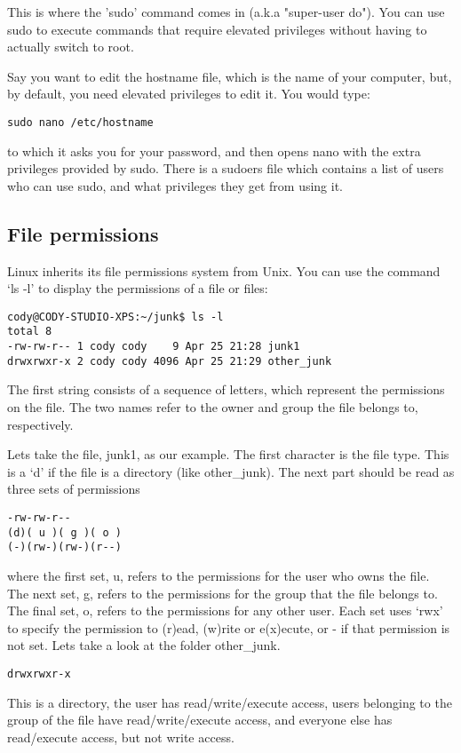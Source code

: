 \documentclass{article}
\begin{document}
This is where the 'sudo' command comes in (a.k.a "super-user do"). You can use sudo to execute commands that require elevated privileges without having to actually switch to root.

Say you want to edit the hostname file, which is the name of your computer, but, by default, you need elevated privileges to edit it. You would type:
\begin{verbatim}
sudo nano /etc/hostname
\end{verbatim}
to which it asks you for your password, and then opens nano with the extra privileges provided by sudo. There is a sudoers file which contains a list of users who can use sudo, and what privileges they get from using it.

\subsection{File permissions}
Linux inherits its file permissions system from Unix. You can use the command `ls -l' to display the permissions of a file or files:
\begin{verbatim}
cody@CODY-STUDIO-XPS:~/junk$ ls -l
total 8
-rw-rw-r-- 1 cody cody    9 Apr 25 21:28 junk1
drwxrwxr-x 2 cody cody 4096 Apr 25 21:29 other_junk
\end{verbatim}
The first string consists of a sequence of letters, which represent the permissions on the file. The two names refer to the owner and group the file belongs to, respectively.

Lets take the file, junk1, as our example.
The first character is the file type. This is a `d' if the file is a directory (like other\_junk).
The next part should be read as three sets of permissions
\begin{verbatim}
-rw-rw-r--
(d)( u )( g )( o ) 
(-)(rw-)(rw-)(r--)
\end{verbatim} 
where the first set, u, refers to the permissions for the user who owns the file.
The next set, g, refers to the permissions for the group that the file belongs to.
The final set, o, refers to the permissions for any other user. 
Each set uses `rwx' to specify the permission to (r)ead, (w)rite or e(x)ecute, or - if that permission is not set.
Lets take a look at the folder other\_junk.
\begin{verbatim}
drwxrwxr-x
\end{verbatim}
This is a directory, the user has read/write/execute access, users belonging to the group of the file have read/write/execute access, and everyone else has read/execute access, but not write access.
\end{document}
